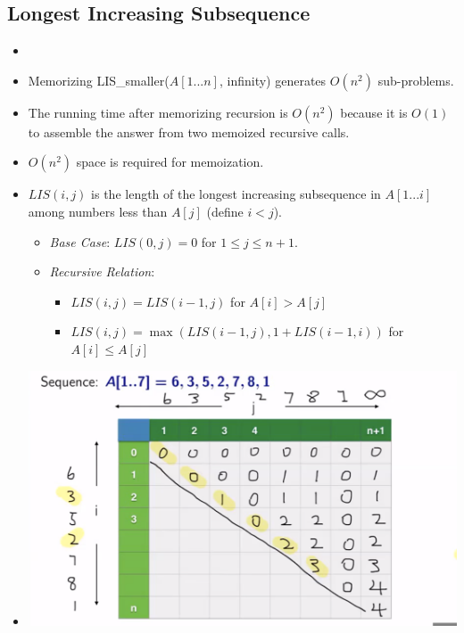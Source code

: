 \subsection{Longest Increasing Subsequence}
\begin{itemize}
    \item[] 
    \item Memorizing LIS\_smaller($A[1...n]$, infinity) generates $O(n^2)$ sub-problems.
    \item The running time after memorizing recursion is $O(n^2)$ because it is $O(1)$ to assemble the answer from two memoized recursive calls.
    \item $O(n^2)$ space is required for memoization.
    \item $LIS(i, j)$ is the length of the longest increasing subsequence in $A[1...i]$ among numbers less than $A[j]$ (define $i < j$).
    \begin{itemize}
        \item \textit{Base Case}: $LIS(0, j) = 0$ for $1 \leq j \leq n + 1$.
        \item \textit{Recursive Relation}:
        \begin{itemize}
            \item $LIS(i, j) = LIS(i - 1, j)$ for $A[i] > A[j]$
            \item $LIS(i, j) = \max(LIS(i - 1, j), 1 + LIS(i - 1, i))$ for $A[i] \leq A[j]$
        \end{itemize}
    \end{itemize}
    \item[] \includegraphics[width=\textwidth]{lecture13/images/lis-memo.png}
\end{itemize}
